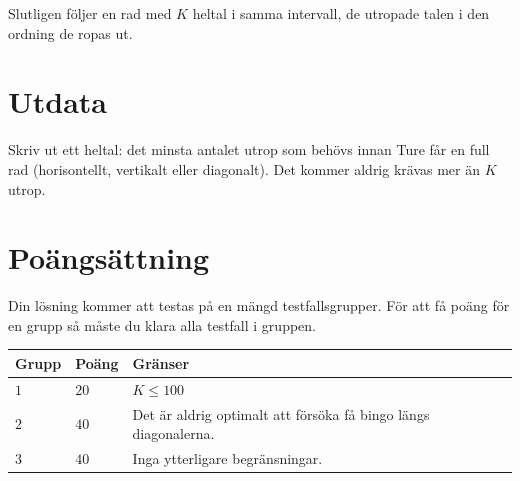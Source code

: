 Slutligen följer en rad med $K$ heltal i samma intervall, de utropade talen i den ordning de ropas ut.

\section*{Utdata}
Skriv ut ett heltal: det minsta antalet utrop som behövs innan Ture får en full rad (horisontellt,
vertikalt eller diagonalt). Det kommer aldrig krävas mer än $K$ utrop.

\section*{Poängsättning}
Din lösning kommer att testas på en mängd testfallsgrupper.
För att få poäng för en grupp så måste du klara alla testfall i gruppen.


\noindent
\begin{tabular}{| l | l | p{12cm} |}
  \hline
  \textbf{Grupp} & \textbf{Poäng} & \textbf{Gränser} \\ \hline
  $1$    & $20$       & $K \leq 100$ \\ \hline
  $2$    & $40$       & Det är aldrig optimalt att försöka få bingo längs diagonalerna. \\ \hline
  $3$    & $40$       & Inga ytterligare begränsningar. \\ \hline
\end{tabular}


